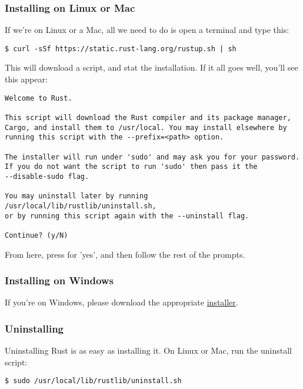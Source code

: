 \subsubsection*{Installing on Linux or Mac}

If we're on Linux or a Mac, all we need to do is open a terminal and type this:

\begin{verbatim}
$ curl -sSf https://static.rust-lang.org/rustup.sh | sh
\end{verbatim}

This will download a script, and stat the installation. If it all goes well, you'll see this appear:

\begin{verbatim}
Welcome to Rust.

This script will download the Rust compiler and its package manager, 
Cargo, and install them to /usr/local. You may install elsewhere by 
running this script with the --prefix=<path> option.

The installer will run under 'sudo' and may ask you for your password. 
If you do not want the script to run 'sudo' then pass it the 
--disable-sudo flag.

You may uninstall later by running /usr/local/lib/rustlib/uninstall.sh,
or by running this script again with the --uninstall flag.

Continue? (y/N)
\end{verbatim}

From here, press  for 'yes', and then follow the rest of the prompts.

\subsubsection*{Installing on Windows}

If you're on Windows, please download the appropriate \href{https://www.rust-lang.org/install.html}{installer}.

\subsubsection*{Uninstalling}

Uninstalling Rust is as easy as installing it. On Linux or Mac, run the uninstall script:

\begin{verbatim}
$ sudo /usr/local/lib/rustlib/uninstall.sh
\end{verbatim}

